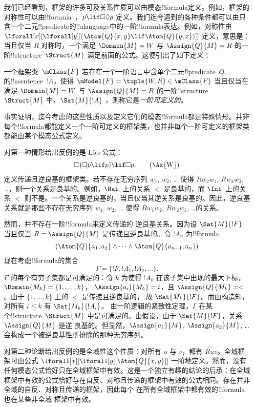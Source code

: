 \documentclass[../../../include/open-logic-section]{subfiles}
\begin{document}


我们已经看到，框架的许多可及关系性质可以由模态!!{formula}定义。例如，框架的对称性可以由!!{formula}~，$p \lif \Box\Diamond
p$ 定义。我们迄今遇到的各种条件都可以由只含一个二元!!{predicate}的!!a{language}中的一阶!!{formula}表达。例如，对称性由
$\lforall[x][\lforall[y][(\Atom{Q}{x,y} \lif \Atom{Q}{y, x})]]$ 定义，意思是：当且仅当 $R$ 对称时，一个满足 $\Domain{M} =
W$ 与 $\Assign{Q}{M} = R$ 的一阶!!{structure}~$\Struct{M}$ 满足前面的公式。这便引出了如下定义：

\begin{defn}
  一个框架类~$\mClass{F}$ 若存在一个一阶语言中含单个二元!!{predicate}~$Q$ 的!!a{sentence}~$!A$，使得 $\mModel{F} =
  \tuple{W, R} \in \mClass{F}$ 当且仅当在满足 $\Domain{M} = W$ 与 $\Assign{Q}{M}
  = R$ 的一阶!!{structure}~$\Struct{M}$ 中，$\Sat{M}{!A}$
  ，则称它是\emph{一阶可定义的}。
\end{defn}

事实证明，迄今考虑的这些性质以及定义它们的模态!!{formula}都是特殊情形。并非每个!!{formula}都能定义一个一阶可定义的框架类，也并非每个一阶可定义的框架类都能由某个模态公式定义。

对第一种情形给出反例的是 L\"ob 公式：
\begin{equation}
\Box(\Box p \lif p) \lif \Box p. \tag{\Ax{W}}
\end{equation}
 定义传递且逆良基的框架类。若不存在无穷序列
$w_1$, $w_2$, \dots{} 使得 $Rw_2w_1$, $Rw_3w_2$, \dots，则一个关系是良基的。例如，$\Nat$~上的关系 $<$ 是良基的，而 $\Int$~上的关系 $<$ 则不是。一个关系是逆良基的，当且仅当其逆关系是良基的。因此，逆良基关系就是那些不存在无穷序列 $w_1$, $w_2$, \dots{}
使得 $Rw_1w_2$, $Rw_2w_3$, \dots 的关系。

然而，并不存在一阶!!{formula}来定义传递的
逆良基关系。因为设 $\Sat{M}{!F}$ 当且仅当 $R =
\Assign{Q}{M}$ 是传递且逆良基的。令 $!A_n$ 为!!{formula}
\[
(\Atom{Q}{a_1,a_2} \land \dots \land
    \Atom{Q}{a_{n-1},a_{n}})
\]
现在考虑!!{formula}的集合
\[
\Gamma = \{!F, !A_1, !A_2, \dots\}.
\]
$\Gamma$ 的每个有穷子集都是可满足的：令 $k$ 为使得 $!A_k$ 在该子集中出现的最大下标，$\Domain{M_k} = \{1, \dots, k\}$，
$\Assign{a_i}{M_k} = i$，且 $\Assign{Q}{M_k} = <$。由于 $\{1,
\dots, k\}$ 上的 $<$ 是传递且逆良基的，
故 $\Sat{M_k}{!F}$。而由构造知，对所有 $i \le k$ 有 $\Sat{M_k}{!A_i}$。
由一阶逻辑的紧致性定理，$\Gamma$ 在某个!!{structure}~$\Struct{M}$ 中是可满足的。由假设，由于
$\Sat{M}{!F}$，关系 $\Assign{Q}{M}$ 是逆
良基的。但显然，$\Assign{a_1}{M}$, $\Assign{a_2}{M}$,
\dots{} 会构成一个被逆良基性所排除的那种无穷序列。

对第二种论断给出反例的是全域性这个性质：对所有 $u$ 与 $v$，都有 $Ruv$。全域框架可由公式
$\lforall[x][\lforall[y][\Atom{Q}{x,y}]]$ 一阶地定义。然而，没有任何模态公式恰好只在全域框架中有效。这是一个独立有趣的结论的后承：在全域框架中有效的公式恰好与在自反、对称且传递的框架中有效的公式相同。存在并非全域的自反、对称且传递的框架，因此每个
在所有全域框架中都有效的!!{formula}也在某些非全域
框架中有效。
\end{document}
